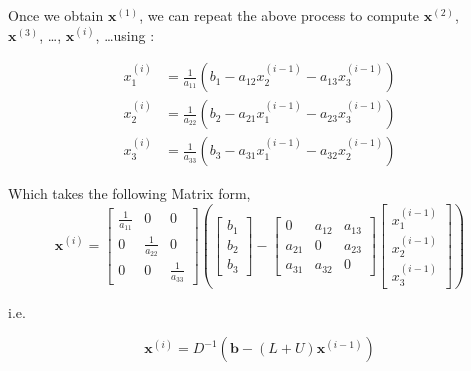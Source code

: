 \documentclass[main]{subfiles}
\begin{document}
    Once we obtain $\textbf{x}^{(1)}$, we can repeat the above process to compute $\textbf{x}^{(2)}$, 
    \\$\textbf{x}^{(3)}$, \ldots, $\textbf{x}^{(i)}$, \ldots using :

    \begin{align*}
        x_1^{(i)}  &= \frac{1}{a_{11}}(b_1 - a_{12}x_2^{(i-1)} - a_{13}x_3^{(i-1)}) \\
        x_2^{(i)}  &= \frac{1}{a_{22}}(b_2 - a_{21}x_1^{(i-1)} - a_{23}x_3^{(i-1)})  \\
        x_3^{(i)}  &= \frac{1}{a_{33}}(b_3 - a_{31}x_1^{(i-1)} - a_{32}x_2^{(i-1)}) 
    \end{align*}

    Which takes the following Matrix form,
    \\

    \begin{equation*}
    \textbf{x}^{(i)} = \begin{bmatrix}
         \frac{1}{a_{11}} &     0            &      0           \\
            0             & \frac{1}{a_{22}} &      0            \\
            0             &     0            & \frac{1}{a_{33}}       
    \end{bmatrix} \left(
    \begin{bmatrix}
        b_{1}  \\
        b_{2}  \\
        b_{3} 
    \end{bmatrix} - 
    \begin{bmatrix}
            0      &     a_{12} &      a_{13}           \\
            a_{21} &     0      &      a_{23}            \\
            a_{31} &     a_{32} &       0       
    \end{bmatrix}
    \begin{bmatrix}
        x_{1}^{(i-1)}  \\
        x_{2}^{(i-1)}  \\
        x_{3}^{(i-1)} 
    \end{bmatrix} \right)    
    \end{equation*}

    \vspace{2mm}
    i.e.

    \[
        \textbf{x}^{(i)} = D^{-1}(\textbf{b} - (L+U) \textbf{x}^{(i-1)})
    \]
\end{document}
